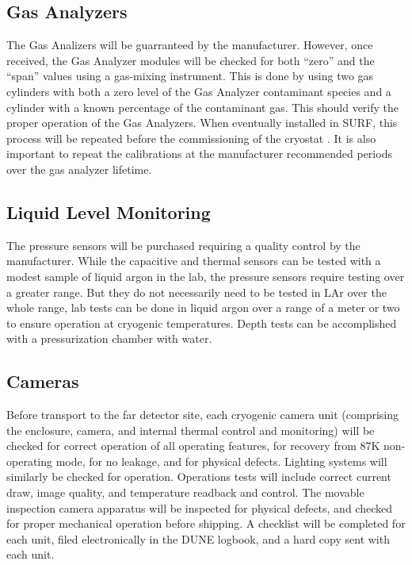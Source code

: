 \subsection{Gas Analyzers}
\label{sec:fdgen-slow-cryo-qc-ga}

The Gas Analizers will be guarranteed by the manufacturer. However, once received, the Gas Analyzer modules will be checked for both ``zero'' and the ``span'' values using a gas-mixing instrument. This is done by using two gas cylinders with both a zero level of the Gas Analyzer contaminant species and a cylinder with a known percentage of the contaminant gas. This should verify the proper operation of the Gas Analyzers. When eventually installed in SURF, this process will be repeated before the commissioning of the cryostat . It is also important to repeat the calibrations at the manufacturer recommended periods over the gas analyzer lifetime.
 

\subsection{Liquid Level Monitoring}
\label{sec:fdgen-slow-cryo-qc-llm}

The pressure sensors will be purchased requiring a quality control by the manufacturer.
While the capacitive and thermal sensors can be tested with a modest sample of liquid argon in the lab,
the pressure sensors require testing over a greater range.  But they do not
necessarily need to be tested in LAr over the whole range,  lab tests
can be done in liquid argon over a range of a meter or two to ensure operation
at cryogenic temperatures.  Depth tests can be accomplished with a
pressurization chamber with water.


\subsection{Cameras}
\label{sec:fdgen-slow-cryo-qc-c}

Before transport to the far detector site, each cryogenic camera unit (comprising the enclosure, camera, and internal thermal control and monitoring) will be checked for correct operation of all operating features, for recovery from 87K non-operating mode, for no leakage, and for physical defects. Lighting systems will similarly be checked for operation. Operations tests will include correct current draw, image quality, and temperature readback and control. The movable inspection camera apparatus will be inspected for physical defects, and checked for proper mechanical operation before shipping. A checklist will be completed for each unit, filed electronically in the DUNE logbook, and a hard copy sent with each unit. 

